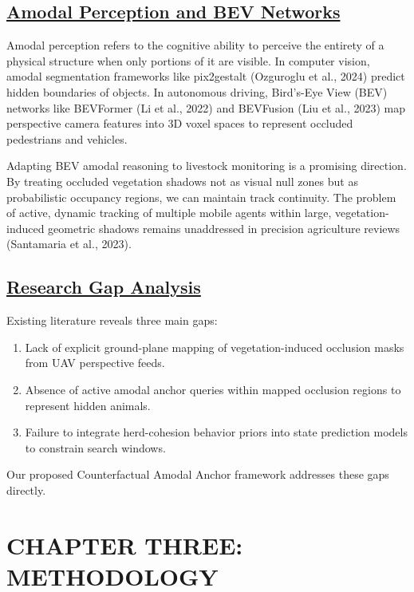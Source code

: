 \documentclass[12pt]{article}
\begin{document}
\subsection*{\underline{\textbf{Amodal Perception and BEV Networks}}}
Amodal perception refers to the cognitive ability to perceive the entirety of a physical structure when only portions of it are visible. In computer vision, amodal segmentation frameworks like pix2gestalt (Ozguroglu et al., 2024) predict hidden boundaries of objects. In autonomous driving, Bird's-Eye View (BEV) networks like BEVFormer (Li et al., 2022) and BEVFusion (Liu et al., 2023) map perspective camera features into 3D voxel spaces to represent occluded pedestrians and vehicles. 

Adapting BEV amodal reasoning to livestock monitoring is a promising direction. By treating occluded vegetation shadows not as visual null zones but as probabilistic occupancy regions, we can maintain track continuity. The problem of active, dynamic tracking of multiple mobile agents within large, vegetation-induced geometric shadows remains unaddressed in precision agriculture reviews (Santamaria et al., 2023).

\subsection*{\underline{\textbf{Research Gap Analysis}}}
Existing literature reveals three main gaps:
\begin{enumerate}
    \item Lack of explicit ground-plane mapping of vegetation-induced occlusion masks from UAV perspective feeds.
    \item Absence of active amodal anchor queries within mapped occlusion regions to represent hidden animals.
    \item Failure to integrate herd-cohesion behavior priors into state prediction models to constrain search windows.
\end{enumerate}
Our proposed Counterfactual Amodal Anchor framework addresses these gaps directly.

\clearpage

\section*{\centering \textbf{CHAPTER THREE: METHODOLOGY}}
\end{document}

